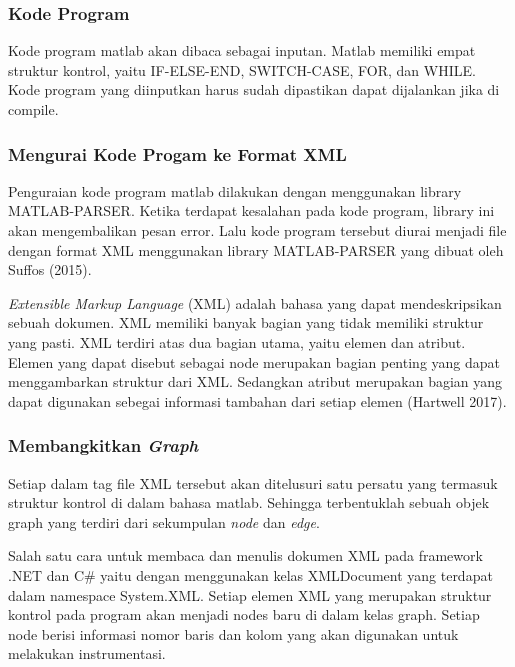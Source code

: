 \subsubsection*{Kode Program}
Kode program matlab akan dibaca sebagai inputan. Matlab memiliki empat struktur kontrol, yaitu IF-ELSE-END, SWITCH-CASE, FOR, dan WHILE. Kode program yang diinputkan harus sudah dipastikan dapat dijalankan jika di compile.

\subsubsection*{Mengurai Kode Progam ke Format XML}
Penguraian kode program matlab dilakukan dengan menggunakan library  MATLAB-PARSER. Ketika terdapat kesalahan pada kode program, library  ini akan mengembalikan pesan error. Lalu kode program tersebut diurai menjadi file dengan format XML menggunakan library MATLAB-PARSER yang dibuat oleh Suffos (2015). 

\textit{Extensible Markup Language} (XML) adalah bahasa yang dapat mendeskripsikan sebuah dokumen. XML memiliki banyak bagian yang tidak memiliki struktur yang pasti. XML terdiri atas dua bagian utama, yaitu elemen dan atribut. Elemen yang dapat disebut sebagai node merupakan bagian penting yang dapat menggambarkan struktur dari XML. Sedangkan atribut merupakan bagian yang dapat digunakan sebegai informasi tambahan dari setiap elemen (Hartwell 2017). 

\subsubsection*{Membangkitkan \textit{Graph}}
Setiap dalam tag file XML tersebut akan ditelusuri satu persatu yang termasuk struktur kontrol di dalam bahasa matlab. Sehingga terbentuklah sebuah objek graph yang terdiri dari sekumpulan \textit{node} dan \textit{edge}. 

Salah satu cara untuk membaca dan menulis dokumen XML pada framework .NET dan C\# yaitu dengan menggunakan kelas XMLDocument yang terdapat dalam namespace System.XML. Setiap elemen XML yang merupakan struktur kontrol pada program akan menjadi nodes baru di dalam kelas graph. Setiap node berisi informasi nomor baris dan kolom yang akan digunakan untuk melakukan instrumentasi.


